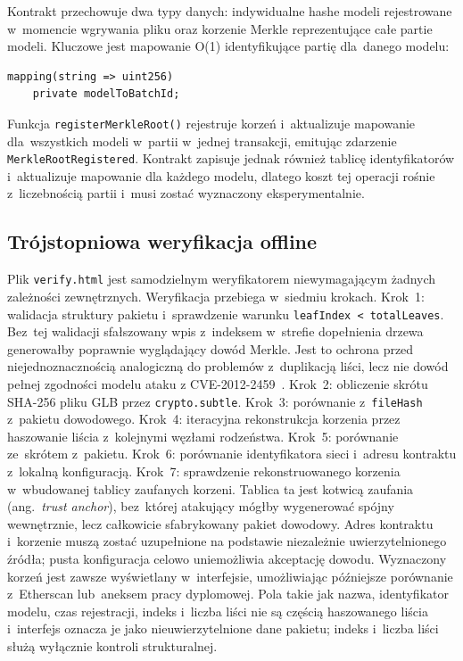 \documentclass[10pt,conference,a4paper]{IEEEtran}
\begin{document}
Kontrakt przechowuje dwa typy danych: indywidualne hashe modeli
rejestrowane w~momencie wgrywania pliku oraz korzenie Merkle
reprezentujące całe partie modeli. Kluczowe jest mapowanie O(1)
identyfikujące partię dla~danego modelu:
\begin{verbatim}
mapping(string => uint256)
    private modelToBatchId;
\end{verbatim}
Funkcja \texttt{registerMerkleRoot()} rejestruje korzeń
i~aktualizuje mapowanie dla~wszystkich modeli w~partii
w~jednej transakcji, emitując zdarzenie
\texttt{MerkleRootRegistered}. Kontrakt zapisuje jednak również
tablicę identyfikatorów i~aktualizuje mapowanie dla każdego
modelu, dlatego koszt tej operacji rośnie z~liczebnością partii
i~musi zostać wyznaczony eksperymentalnie.

\subsection{Trójstopniowa weryfikacja offline}

Plik \texttt{verify.html} jest samodzielnym weryfikatorem
niewymagającym żadnych zależności zewnętrznych. Weryfikacja
przebiega w~siedmiu krokach. Krok~1: walidacja struktury
pakietu i~sprawdzenie warunku
\texttt{leafIndex < totalLeaves}. Bez~tej walidacji
sfałszowany wpis z~indeksem w~strefie dopełnienia drzewa
generowałby poprawnie wyglądający dowód Merkle. Jest to ochrona
przed niejednoznacznością analogiczną do problemów z~duplikacją
liści, lecz nie dowód pełnej zgodności modelu ataku z
CVE-2012-2459~\cite{cve2012}. Krok~2:
obliczenie skrótu SHA-256 pliku GLB przez
\texttt{crypto.subtle}. Krok~3: porównanie z~\texttt{fileHash}
z~pakietu dowodowego. Krok~4: iteracyjna rekonstrukcja korzenia
przez haszowanie liścia z~kolejnymi węzłami rodzeństwa.
Krok~5: porównanie ze~skrótem z~pakietu. Krok~6: porównanie
identyfikatora sieci i~adresu kontraktu z~lokalną konfiguracją.
Krok~7: sprawdzenie rekonstruowanego korzenia w~wbudowanej tablicy zaufanych
korzeni. Tablica ta jest kotwicą zaufania (ang.~\textit{trust
anchor}), bez~której atakujący mógłby wygenerować spójny
wewnętrznie, lecz całkowicie sfabrykowany pakiet dowodowy.
Adres kontraktu i~korzenie muszą zostać uzupełnione na podstawie
niezależnie uwierzytelnionego źródła; pusta konfiguracja celowo
uniemożliwia akceptację dowodu. Wyznaczony korzeń jest zawsze
wyświetlany w~interfejsie, umożliwiając późniejsze porównanie
z~Etherscan lub~aneksem pracy dyplomowej. Pola takie jak nazwa,
identyfikator modelu, czas rejestracji, indeks i~liczba liści nie
są częścią haszowanego liścia i~interfejs oznacza je jako
nieuwierzytelnione dane pakietu; indeks i~liczba liści służą
wyłącznie kontroli strukturalnej.
\end{document}
